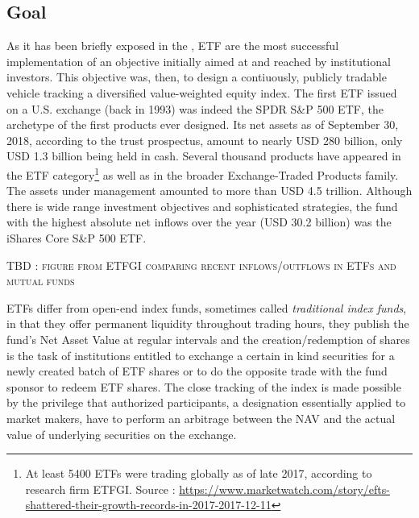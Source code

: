 \subsection{Goal}
As it has been briefly exposed in the , ETF are the most successful implementation of an objective initially aimed at and reached by institutional investors. This objective was, then, to design a contiuously, publicly tradable vehicle tracking a diversified value-weighted equity index. The first ETF issued on a U.S. exchange (back in 1993)  was indeed the SPDR S\&P 500 ETF, the archetype of the first products ever designed. Its net assets as of September 30, 2018, according to the trust prospectus, amount to nearly USD 280 billion, only USD 1.3 billion being held in cash. Several thousand products have appeared in the ETF category\footnote{At least 5400 ETFs were trading globally as of late 2017, according to research firm ETFGI. Source : \url{https://www.marketwatch.com/story/efts-shattered-their-growth-records-in-2017-2017-12-11}} as well as in the broader Exchange-Traded Products family. The assets under management amounted to more than USD 4.5 trillion. Although there is wide range investment objectives and sophisticated strategies, the fund with the highest absolute net inflows over the year (USD 30.2 billion) was the iShares Core S\&P 500 ETF.

\begin{center}
  \textsc{TBD : figure from ETFGI comparing recent inflows/outflows in ETFs and mutual funds}
  \end{center}

ETFs differ from open-end index funds, sometimes called \textit{traditional index funds}, in that they offer permanent liquidity throughout trading hours, they publish the fund's Net Asset Value at regular intervals and the creation/redemption of shares is the task of institutions entitled to exchange a certain in kind securities for a newly created batch of ETF shares or to do the opposite trade with the fund sponsor to redeem ETF shares. The close tracking of the index is made possible by the privilege that authorized participants, a designation essentially applied to market makers, have to perform an arbitrage between the NAV and the actual value of underlying securities on the exchange. \parencite{Ben-David2017}

